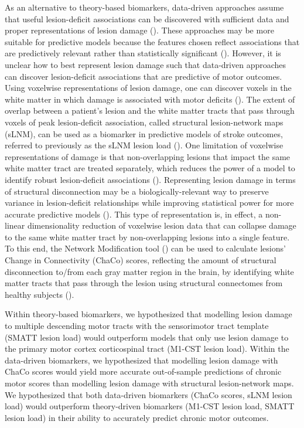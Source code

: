 \documentclass[10pt]{article}
\begin{document}
As an alternative to theory-based biomarkers, data-driven approaches assume that useful lesion-deficit associations can be discovered with sufficient data and proper representations of lesion damage (\cite{Kasties2021-rm, Bourached2022-vz, }). These approaches may be more suitable for predictive models because the features chosen reflect associations that are predictively relevant rather than statistically significant (\cite{Bzdok2020-py}). However, it is unclear how to best represent lesion damage such that data-driven approaches can discover lesion-deficit associations that are predictive of motor outcomes. Using voxelwise representations of lesion damage, one can discover voxels in the white matter in which damage is associated with motor deficits (\cite{Bowren2022-rs}). The extent of overlap between a patient's lesion and the white matter tracts that pass through voxels of peak lesion-deficit association, called structural lesion-network maps (sLNM), can be used as a biomarker in predictive models of stroke outcomes, referred to previously as the sLNM lesion load (\cite{Bowren2022-rs}). One limitation of voxelwise representations of damage is that non-overlapping lesions that impact the same white matter tract are treated separately, which reduces the power of a model to identify robust lesion-deficit associations (\cite{Sperber2022-oj}). Representing lesion damage in terms of structural disconnection may be a biologically-relevant way to preserve variance in lesion-deficit relationships while improving statistical power for more accurate predictive models (\cite{Sperber2022-oj}). This type of representation is, in effect, a non-linear dimensionality reduction of voxelwise lesion data that can collapse damage to the same white matter tract by non-overlapping lesions into a single feature. To this end, the Network Modification tool (\cite{Kuceyeski2013-nk}) can be used to calculate lesions' Change in Connectivity (ChaCo) scores, reflecting the amount of structural disconnection to/from each gray matter region in the brain, by identifying white matter tracts that pass through the lesion using structural connectomes from healthy subjects (\cite{Kuceyeski2013-nk, Kuceyeski2016-vj, Salvalaggio2020-pe, Griffis2019-cy, Sperber2022-oj}).
 
Within theory-based biomarkers, we hypothesized that modelling lesion damage to multiple descending motor tracts with the sensorimotor tract template (SMATT lesion load) would outperform models that only use lesion damage to the primary motor cortex corticospinal tract (M1-CST lesion load). Within the data-driven biomarkers, we hypothesized that  modelling lesion damage with ChaCo scores would yield more accurate out-of-sample predictions of chronic motor scores than modelling lesion damage with structural lesion-network maps. We hypothesized that both data-driven biomarkers (ChaCo scores, sLNM lesion load) would outperform theory-driven biomarkers (M1-CST lesion load, SMATT lesion load) in their ability to accurately predict chronic motor outcomes. 
\end{document}
